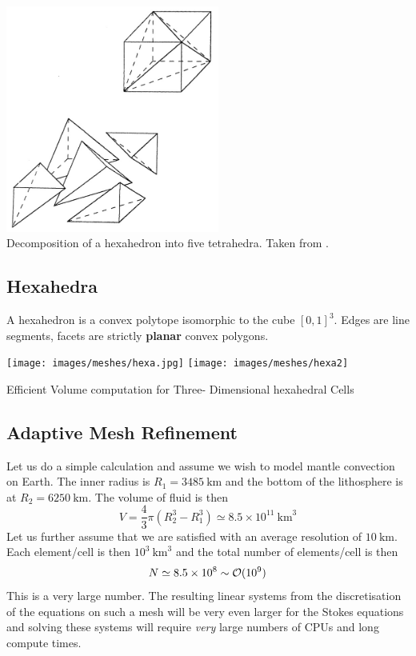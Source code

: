 \begin{center}
\includegraphics[width=7cm]{images/meshes/cube_division}\\
{\captionfont Decomposition of a hexahedron into five tetrahedra. Taken from \cite{begt92}.}
\end{center}

\subsection{Hexahedra}

A hexahedron is a convex polytope isomorphic to the cube $[0,1]^3$.
Edges are line segments, facets are strictly {\bf planar} convex polygons.

\begin{center}
\texttt{[image: images/meshes/hexa.jpg]}
\texttt{[image: images/meshes/hexa2]}
\end{center}

\Literature Efficient Volume computation for Three- Dimensional hexahedral Cells \cite{duko88,gran97}

\subsection{Adaptive Mesh Refinement}
 

Let us do a simple calculation and assume we wish to model mantle convection on Earth. 
The inner radius is $R_1=3485~\si{\km}$ and the bottom of the lithosphere is at $R_2=6250~\si{\km}$. 
The volume of fluid is then 
\[
V = \frac{4}{3}\pi (R_2^3-R_1^3) \simeq 8.5\times 10^{11}~\si{\km}^3
\]
Let us further assume that we are satisfied with an average resolution of $10~\si{\km}$. 
Each element/cell is then $10^3~\si{\km}^3$ and the total number of elements/cell is then 
\[
N \simeq 8.5 \times 10^8 \sim {\cal O}(10^9)
\]
This is a very large number. The resulting linear systems from the discretisation of the 
equations on such a mesh will be very even larger for the Stokes equations and solving 
these systems will require {\it very} large numbers of CPUs and long compute times. 

